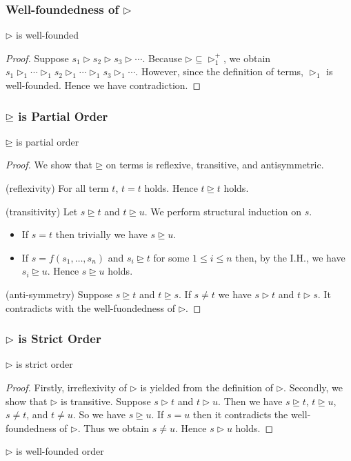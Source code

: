 \documentclass[12pt,aspectratio=169]{beamer}
\begin{document}
\begin{frame}
    \frametitle{Well-foundedness of $\rhd$}
    \begin{lemma}
        $\rhd$ is well-founded
    \end{lemma}
    \begin{proof}
        Suppose $s_1 \rhd s_2 \rhd s_3 \rhd \cdots$.
        Because $\rhd \subseteq \rhd_1^+$,
        we obtain $s_1 \rhd_1 \cdots \rhd_1 s_2 \rhd_1 \cdots \rhd_1 s_3 \rhd_1 \cdots$.
        However, since the definition of terms, $\rhd_1$ is well-founded.
        Hence we have contradiction.
    \end{proof}
\end{frame}

\begin{frame}
    \frametitle{$\unrhd$ is Partial Order}

    \begin{lemma}
        $\unrhd$ is partial order
    \end{lemma}

    \begin{proof}
        We show that $\unrhd$ on terms is reflexive, transitive, and antisymmetric.

        (reflexivity) For all term $t$, $t = t$ holds. Hence $t \unrhd t$ holds.

        (transitivity) Let $s \unrhd t$ and $t \unrhd u$. We perform structural induction on $s$.
        \begin{itemize}
            \item If $s = t$ then trivially we have $s \unrhd u$.
            \item If $s = f(s_1, \dots, s_n)$ and $s_i \unrhd t$ for some $1 \leq i \leq n$ then, 
            by the I.H., we have $s_i \unrhd u$. Hence $s \unrhd u$ holds.
        \end{itemize}

        (anti-symmetry) Suppose $s \unrhd t$ and $t \unrhd s$. If $s \neq t$ we have $s \rhd t$ and $t \rhd s$.
        It contradicts with the well-fuondedness of $\rhd$.
    \end{proof}
\end{frame}

\begin{frame}
    \frametitle{$\rhd$ is Strict Order}
    \begin{lemma}
        $\rhd$ is strict order
    \end{lemma}
    \begin{proof}
        Firstly, irreflexivity of $\rhd$ is yielded from the definition of $\rhd$.
        Secondly, we show that $\rhd$ is transitive. Suppose $s \rhd t$ and $t \rhd u$.
        Then we have $s \unrhd t$, $t \unrhd u$, $s \neq t$, and $t \neq u$.
        So we have $s \unrhd u$. If $s = u$ then it contradicts the well-foundedness of $\rhd$.
        Thus we obtain $s \neq u$. Hence $s \rhd u$ holds.
    \end{proof}
    \begin{corollary}
        $\rhd$ is well-founded order
    \end{corollary}
\end{frame}
\end{document}
